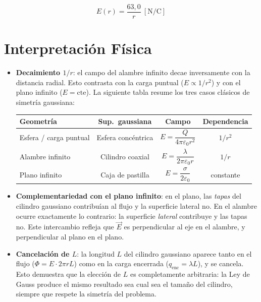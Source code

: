 \documentclass[12pt,letterpaper]{article}
\begin{document}
\[
    E(r) = \frac{63{,}0}{r}\ [\text{N/C}]
\]

\section*{Interpretaci\'on F\'isica}

\begin{itemize}
    \item \textbf{Decaimiento $1/r$}: el campo del alambre infinito decae inversamente
          con la distancia radial. Esto contrasta con la carga puntual ($E\propto 1/r^2$)
          y con el plano infinito ($E=\text{cte}$). La siguiente tabla resume los tres
          casos cl\'asicos de simetr\'ia gaussiana:

    \begin{center}
    \renewcommand{\arraystretch}{1.4}
    \begin{tabular}{lccc}
        \hline
        \textbf{Geometr\'ia} & \textbf{Sup.\ gaussiana} & \textbf{Campo} & \textbf{Dependencia} \\
        \hline
        Esfera / carga puntual  & Esfera conc\'entrica  & $E = \dfrac{Q}{4\pi\varepsilon_0 r^2}$ & $1/r^2$ \\
        Alambre infinito        & Cilindro coaxial      & $E = \dfrac{\lambda}{2\pi\varepsilon_0 r}$ & $1/r$ \\
        Plano infinito          & Caja de pastilla      & $E = \dfrac{\sigma}{2\varepsilon_0}$       & constante \\
        \hline
    \end{tabular}
    \end{center}

    \item \textbf{Complementariedad con el plano infinito}: en el plano, las
          \emph{tapas} del cilindro gaussiano contribu\'ian al flujo y la superficie
          lateral no. En el alambre ocurre exactamente lo contrario: la
          superficie \emph{lateral} contribuye y las tapas no.
          Este intercambio refleja que $\vec{E}$ es perpendicular al eje en el
          alambre, y perpendicular al plano en el plano.

    \item \textbf{Cancelaci\'on de $L$}: la longitud $L$ del cilindro gaussiano
          aparece tanto en el flujo ($\Phi = E\cdot 2\pi r L$) como en la carga
          encerrada ($q_\text{enc} = \lambda L$), y se cancela. Esto demuestra que
          la elecci\'on de $L$ es completamente arbitraria: la Ley de Gauss
          produce el mismo resultado sea cual sea el tama\~no del cilindro,
          siempre que respete la simetr\'ia del problema.
\end{itemize}
\end{document}
